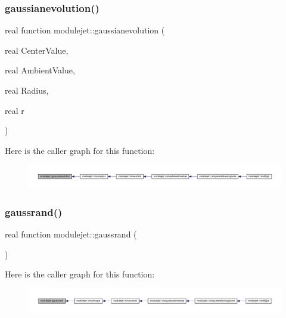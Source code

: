 \subsubsection{\texorpdfstring{gaussianevolution()}{gaussianevolution()}}
{\footnotesize\ttfamily real function modulejet\+::gaussianevolution (\begin{DoxyParamCaption}\item[{real}]{Center\+Value,  }\item[{real}]{Ambient\+Value,  }\item[{real}]{Radius,  }\item[{real}]{r }\end{DoxyParamCaption})\hspace{0.3cm}{\ttfamily [private]}}

Here is the caller graph for this function\+:\nopagebreak
\begin{figure}[H]
\begin{center}
\leavevmode
\includegraphics[width=350pt]{namespacemodulejet_a54205285b4f5a4d3d7204aa240f92d64_icgraph}
\end{center}
\end{figure}
\mbox{\label{namespacemodulejet_a5b1cd3a55b2e6494e998c7233db5ec58}} 
\subsubsection{\texorpdfstring{gaussrand()}{gaussrand()}}
{\footnotesize\ttfamily real function modulejet\+::gaussrand (\begin{DoxyParamCaption}{ }\end{DoxyParamCaption})\hspace{0.3cm}{\ttfamily [private]}}

Here is the caller graph for this function\+:\nopagebreak
\begin{figure}[H]
\begin{center}
\leavevmode
\includegraphics[width=350pt]{namespacemodulejet_a5b1cd3a55b2e6494e998c7233db5ec58_icgraph}
\end{center}
\end{figure}
\mbox{\label{namespacemodulejet_af33eb9ee692e4270d09338bd74aa8851}} 
